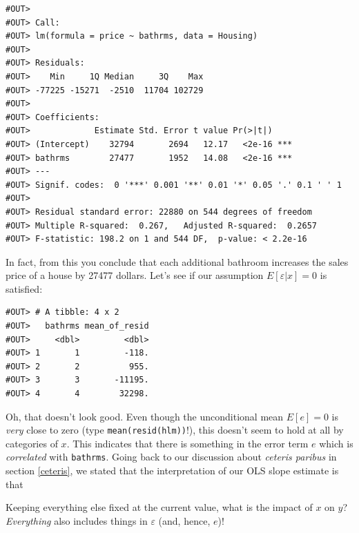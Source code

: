 \documentclass[]{book}
\newenvironment{Shaded}{\begin{snugshade}}{\end{snugshade}}
\newcommand{\KeywordTok}[1]{\textcolor[rgb]{0.13,0.29,0.53}{\textbf{#1}}}
\newcommand{\DataTypeTok}[1]{\textcolor[rgb]{0.13,0.29,0.53}{#1}}
\newcommand{\StringTok}[1]{\textcolor[rgb]{0.31,0.60,0.02}{#1}}
\newcommand{\CommentTok}[1]{\textcolor[rgb]{0.56,0.35,0.01}{\textit{#1}}}
\newcommand{\OperatorTok}[1]{\textcolor[rgb]{0.81,0.36,0.00}{\textbf{#1}}}
\newcommand{\NormalTok}[1]{#1}
\newenvironment{tip}{\begin{tcolorbox}[colback=green!5!white,colframe=green]}{\end{tcolorbox}}
\begin{document}
\begin{verbatim}
#OUT> 
#OUT> Call:
#OUT> lm(formula = price ~ bathrms, data = Housing)
#OUT> 
#OUT> Residuals:
#OUT>    Min     1Q Median     3Q    Max 
#OUT> -77225 -15271  -2510  11704 102729 
#OUT> 
#OUT> Coefficients:
#OUT>             Estimate Std. Error t value Pr(>|t|)    
#OUT> (Intercept)    32794       2694   12.17   <2e-16 ***
#OUT> bathrms        27477       1952   14.08   <2e-16 ***
#OUT> ---
#OUT> Signif. codes:  0 '***' 0.001 '**' 0.01 '*' 0.05 '.' 0.1 ' ' 1
#OUT> 
#OUT> Residual standard error: 22880 on 544 degrees of freedom
#OUT> Multiple R-squared:  0.267,   Adjusted R-squared:  0.2657 
#OUT> F-statistic: 198.2 on 1 and 544 DF,  p-value: < 2.2e-16
\end{verbatim}

In fact, from this you conclude that each additional bathroom increases
the sales price of a house by 27477 dollars. Let's see if our assumption
\(E[\varepsilon|x] = 0\) is satisfied:

\begin{Shaded}
\end{Shaded}

\begin{verbatim}
#OUT> # A tibble: 4 x 2
#OUT>   bathrms mean_of_resid
#OUT>     <dbl>         <dbl>
#OUT> 1       1         -118.
#OUT> 2       2          955.
#OUT> 3       3       -11195.
#OUT> 4       4        32298.
\end{verbatim}

Oh, that doesn't look good. Even though the unconditional mean
\(E[e] = 0\) is \emph{very} close to zero (type
\texttt{mean(resid(hlm))}!), this doesn't seem to hold at all by
categories of \(x\). This indicates that there is something in the error
term \(e\) which is \emph{correlated} with \texttt{bathrms}. Going back
to our discussion about \emph{ceteris paribus} in section \ref{ceteris},
we stated that the interpretation of our OLS slope estimate is that

\begin{tip}
Keeping everything else fixed at the current value, what is the impact
of \(x\) on \(y\)? \emph{Everything} also includes things in
\(\varepsilon\) (and, hence, \(e\))!
\end{tip}
\end{document}
